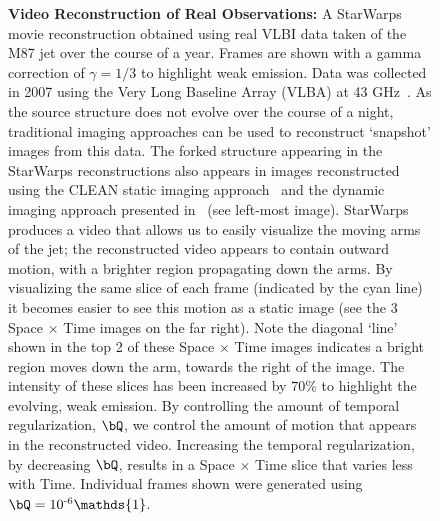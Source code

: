 \begin{figure}
\begin{center}
\vspace*{-.27in}
		\caption{{\bf Video Reconstruction of Real Observations:} A StarWarps movie reconstruction obtained using real VLBI data taken of the M87 jet over the course of a year. Frames are shown with a gamma correction of $\gamma={1}/{3}$ to highlight weak emission. Data was collected in 2007 using the Very Long Baseline Array (VLBA) at 43 GHz~\cite{walker2016observations}. As the source structure does not evolve over the course of a night, traditional imaging approaches can be used to reconstruct `snapshot' images from this data. 
			The forked structure appearing in the StarWarps reconstructions also appears in images reconstructed using the CLEAN static imaging approach~\cite{walker2016observations} and the dynamic imaging approach presented in~\cite{Johnson_dynamical} (see left-most image). 
StarWarps produces a video that allows us to easily visualize the moving arms of the jet; the reconstructed video appears to contain outward motion, with a brighter region propagating down the arms. By visualizing the same slice of each frame (indicated by the cyan line) it becomes easier to see this motion as a static image (see the 3 Space $\times$ Time images on the far right). Note the diagonal `line' shown in the top 2 of these Space $\times$ Time images indicates a bright region moves down the arm, towards the right of the image. The intensity of these slices has been increased by $70 \%$ to highlight the evolving, weak emission. By controlling the amount of temporal regularization, $\bQ$, we control the amount of motion that appears in the reconstructed video. Increasing the temporal regularization, by decreasing $\bQ$, results in a Space $\times$ Time slice that varies less with Time. Individual frames shown were generated using $\bQ = 10^{\text{-}6} \mathds{1}$. }
\vspace{-.3in}
		\label{fig:m87}
	\end{center}
\end{figure}



